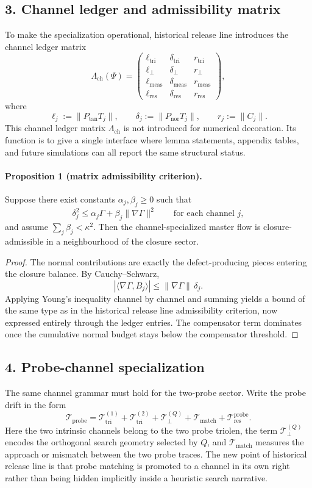 \documentclass[12pt,a4paper]{article}
\DeclareRobustCommand{\QSCver}[1]{archival stage}
\renewcommand{\QSCver}[1]{historical release line}
\begin{document}
\subsection*{3. Channel ledger and admissibility matrix}
To make the specialization operational, \QSCver{v2.4.0} introduces the channel
ledger matrix
\[
\Lambda_{\mathrm{ch}}(\Psi)=
\begin{pmatrix}
\ell_{\mathrm{tri}} & \delta_{\mathrm{tri}} & r_{\mathrm{tri}}\\
\ell_{\perp} & \delta_{\perp} & r_{\perp}\\
\ell_{\mathrm{meas}} & \delta_{\mathrm{meas}} & r_{\mathrm{meas}}\\
\ell_{\mathrm{res}} & \delta_{\mathrm{res}} & r_{\mathrm{res}}
\end{pmatrix},
\]
where
\[
\ell_j := \|P_{\mathrm{tan}}T_j\|,
\qquad
\delta_j := \|P_{\mathrm{nor}}T_j\|,
\qquad
r_j := \|C_j\|.
\]
This channel ledger matrix $\Lambda_{\mathrm{ch}}$ is not introduced for numerical decoration. Its function is to give a
single interface where lemma statements, appendix tables, and future simulations
can all report the same structural status.

\paragraph{Proposition 1 (matrix admissibility criterion).}
Suppose there exist constants $\alpha_j,\beta_j\ge0$ such that
\[
\delta_j^2 \le \alpha_j \Gamma + \beta_j \|\nabla\Gamma\|^2
\qquad\text{for each channel }j,
\]
and assume $\sum_j \beta_j < \kappa^2$. Then the channel-specialized master flow is
closure-admissible in a neighbourhood of the closure sector.

\begin{proof}
The normal contributions are exactly the defect-producing pieces entering the
closure balance. By Cauchy--Schwarz,
\[
|\langle \nabla\Gamma, B_j\rangle|
\le \|\nabla\Gamma\|\,\delta_j.
\]
Applying Young's inequality channel by channel and summing yields a bound of the
same type as in the \QSCver{v2.3.0} admissibility criterion, now expressed entirely through
the ledger entries. The compensator term dominates once the cumulative normal
budget stays below the compensator threshold.
\end{proof}

\subsection*{4. Probe-channel specialization}
The same channel grammar must hold for the two-probe sector. Write the probe drift
in the form
\[
\mathcal T_{\mathrm{probe}} =
\mathcal T_{\mathrm{tri}}^{(1)} +
\mathcal T_{\mathrm{tri}}^{(2)} +
\mathcal T_{\perp}^{(Q)} +
\mathcal T_{\mathrm{match}} +
\mathcal T_{\mathrm{res}}^{\mathrm{probe}}.
\]
Here the two intrinsic channels belong to the two probe triolen, the term
$\mathcal T_{\perp}^{(Q)}$ encodes the orthogonal search geometry selected by $Q$,
and $\mathcal T_{\mathrm{match}}$ measures the approach or mismatch between the two
probe traces. The new point of \QSCver{v2.4.0} is that probe matching is promoted to
a channel in its own right rather than being hidden implicitly inside a heuristic
search narrative.
\end{document}
